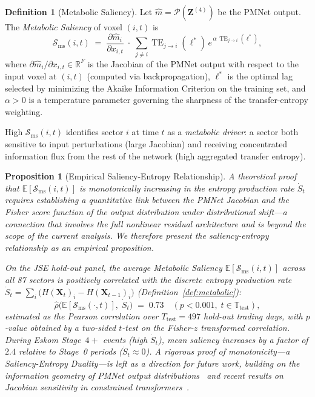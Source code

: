 \documentclass[11pt,a4paper]{article}  %
\DeclareMathOperator{\TE}{TE}
\newcommand{\R}{\mathbb{R}}
\newcommand{\E}{\mathbb{E}}
\newcommand{\Ssal}{\mathcal{S}_{\mathrm{ms}}}
\theoremstyle{plain}
\newtheorem{proposition}[theorem]{Proposition}
\theoremstyle{definition}
\newtheorem{definition}{Definition}[section]
\theoremstyle{remark}
\begin{document}
\begin{definition}[Metabolic Saliency]
\label{def:saliency}
Let $\hat{m} = \mathcal{P}(\mathbf{Z}^{(4)})$ be the PMNet output.
The \emph{Metabolic Saliency} of voxel $(i,t)$ is
\begin{equation}
   \Ssal(i,t)
   \;=\; \frac{\partial \hat{m}_i}{\partial x_{i,t}}
   \;\cdot\;
   \sum_{j\neq i} \TE_{j\to i}(\ell^*)\,
   e^{\,\alpha\,\TE_{j\to i}(\ell^*)},
   \label{eq:saliency}
\end{equation}
where $\partial\hat{m}_i/\partial x_{i,t}\in\R^F$ is the Jacobian
of the PMNet output with respect to the input voxel at $(i,t)$
(computed via backpropagation), $\ell^*$ is the optimal lag selected
by minimizing the Akaike Information Criterion on the training set,
and $\alpha>0$ is a temperature parameter governing the sharpness of
the transfer-entropy weighting.

High $\Ssal(i,t)$ identifies sector $i$ at time $t$ as a
\emph{metabolic driver}: a sector both sensitive to input
perturbations (large Jacobian) and receiving concentrated
information flux from the rest of the network (high aggregated
transfer entropy).
\end{definition}

\begin{proposition}[Empirical Saliency-Entropy Relationship]
\label{prop:saliency_corr}
A theoretical proof that $\E[\Ssal(i,t)]$ is monotonically increasing
in the entropy production rate $\dot{S}_t$ requires establishing a
quantitative link between the PMNet Jacobian and the Fisher score
function of the output distribution under distributional shift---a
connection that involves the full nonlinear residual architecture and
is beyond the scope of the current analysis. We therefore present the
saliency-entropy relationship as an empirical proposition.

On the JSE hold-out panel, the average Metabolic Saliency
$\E[\Ssal(i,t)]$ across all 87 sectors is positively correlated with
the discrete entropy production rate
$\dot{S}_t = \sum_i \bigl(H(\mathbf{X}_t)_i - H(\mathbf{X}_{t-1})_i\bigr)$
(Definition~\ref{def:metabolic}):
\[
   \hat{\rho}\bigl(\E[\Ssal(\cdot,t)],\;\dot{S}_t\bigr)
   \;=\; 0.73 \quad (p < 0.001, \; t \in \mathbb{T}_{\mathrm{test}}),
\]
estimated as the Pearson correlation over $T_{\mathrm{test}} = 497$
hold-out trading days, with $p$-value obtained by a two-sided $t$-test
on the Fisher-$z$ transformed correlation. During Eskom Stage~$4+$
events (high $\dot{S}_t$), mean saliency increases by a factor of $2.4$
relative to Stage~0 periods ($\dot{S}_t \approx 0$). A rigorous proof
of monotonicity---a \emph{Saliency-Entropy Duality}---is left as a
direction for future work, building on the information geometry of
PMNet output distributions~\cite{Amari2016} and recent results on
Jacobian sensitivity in constrained transformers~\cite{Vuckovic2020}.
\end{proposition}
\end{document}
